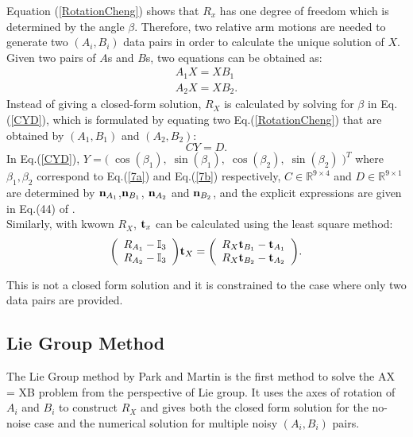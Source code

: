\documentclass[twocolumn,10pt]{asme2ej}
\newcommand{\nn}{{\bf n}}
\newcommand{\ttt}{{\bf t}}
\begin{document}
Equation (\ref{RotationCheng}) shows that $R_{x}$ has one degree of freedom which is determined by the angle $\beta$. Therefore, two relative arm motions are needed to generate two $(A_{i}, B_{i})$ data pairs in order to calculate the unique solution of $X$. Given two pairs of $A$s and $B$s, two equations can be obtained as:
\begin{subequations}
\begin{gather}
A_{1}X = XB_{1} \label{7a}\\
A_{2}X = XB_{2}.\label{7b}
\end{gather}
\end{subequations}
Instead of giving a closed-form solution, $R_{X}$ is calculated by solving for $\beta$ in Eq.(\ref{CYD}), which is formulated by equating two Eq.(\ref{RotationCheng}) that are obtained by $(A_{1}, B_{1})$ and $(A_{2}, B_{2})$:
\begin{equation}
CY = D.
\label{CYD}
\end{equation}
In Eq.(\ref{CYD}), $Y = \big( \; \cos(\beta_{1}),\; \sin(\beta_{1}), \; \cos(\beta_{2}),\; 	\sin(\beta_{2}) \;\big)^{T}$ where $\beta_{1}, \beta_{2}$ correspond to Eq.(\ref{7a}) and Eq.(\ref{7b}) respectively,  $C \in \mathbb{R}^{9 \times 4}$ and $D \in \mathbb{R}^{9 \times 1}$ are determined by $\nn_{A_{1}}$,$\nn_{B_{1}}$, $\nn_{A_{2}}$ and $\nn_{B_{2}}$, and the explicit expressions are given in Eq.(44) of \cite{shiu1989calibration}.\\
 Similarly, with kwown $R_{X}$, $\ttt_{x}$ can be calculated using the least square method:
\begin{equation}
\bigg(\begin{array}{lr}
R_{A_{1}} - \mathbb{I}_{3} \\
R_{A_{2}} - \mathbb{I}_{3}
\end{array}\bigg)\ttt_{X}=
\bigg(\begin{array}{lr}
R_{X}\ttt_{B_{1}} - \ttt_{A_{1}}\\
R_{X}\ttt_{B_{2}} - \ttt_{A_{2}}
\end{array}
\bigg).
\label{trans}
\end{equation}

This is not a closed form solution and it is constrained to the case where only two data pairs are provided. 

\subsection{Lie Group Method }
The Lie Group method \cite{park1994robot} by Park and Martin is the first method to solve the AX = XB problem from the perspective of Lie group. It uses the axes of rotation of $A_{i}$ and $B_{i}$ to construct $R_{X}$ and gives both the closed form solution for the no-noise case and the numerical solution for multiple noisy $(A_{i}, B_{i})$ pairs.
\end{document}

